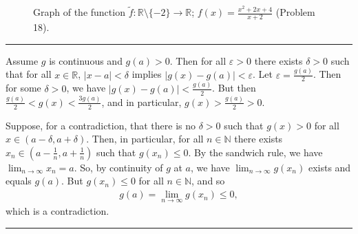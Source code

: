 \documentclass[letterpaper,10pt,english]{jupyterBook}
\let\sphinxpxdimen\pdfpxdimen\else\newdimen\sphinxpxdimen
\begin{document}
\begin{figure}[htbp]
\centering
\capstart

\noindent\sphinxincludegraphics[width=500\sphinxpxdimen]{{(x2+2x+4),(x+2)}.png}
\caption{Graph of the function \(\tilde{f}:\mathbb{R}\setminus\{-2\}\to\mathbb{R}\); \(f(x)=\frac{x^2+2x+4}{x+2}\) (Problem 18).}\label{\detokenize{Solutions-full:q18}}\end{figure}


\bigskip\hrule\bigskip


\sphinxAtStartPar
{\hyperref[\detokenize{Problems:id19}]{}}  Assume \(g\) is continuous and \(g(a) > 0\). Then for all \(\varepsilon>0\) there exists \(\delta>0\) such that for all \(x\in\mathbb{R}\), \(|x-a|<\delta\) implies \(|g(x)-g(a)|<\varepsilon\). Let \(\varepsilon=\frac{g(a)}{2}\). Then for some \(\delta>0\), we have \(|g(x)-g(a)|<\frac{g(a)}{2}\). But then \(\frac{g(a)}{2}<g(x)<\frac{3g(a)}{2}\), and in particular, \(g(x)>\frac{g(a)}{2}>0\).

\sphinxAtStartPar
{}
Suppose, for a contradiction, that  there is no  \(\delta > 0\) such that \(g(x) > 0\)  for all \( x \in (a - \delta, a + \delta)\). Then, in particular, for all \(n\in\mathbb{N}\) there exists \(x_{n} \in \left(a - \frac{1}{n}, a + \frac{1}{n}\right)\) such that \(g(x_{n}) \leq 0\). By the sandwich rule, we have \(\lim_{n\rightarrow\infty} x_{n} = a\). So, by continuity of \(g\) at \(a\), we have \(\lim_{n\rightarrow\infty} g(x_{n})\) exists and equals \(g(a)\). But \(g(x_n)\leq 0\) for all \(n\in\mathbb{N}\), and so
\begin{equation*}
\begin{split}
g(a)=\lim_{n\rightarrow\infty} g(x_{n}) \leq 0,
\end{split}
\end{equation*}
\sphinxAtStartPar
which is a contradiction.


\bigskip\hrule\bigskip
\end{document}

